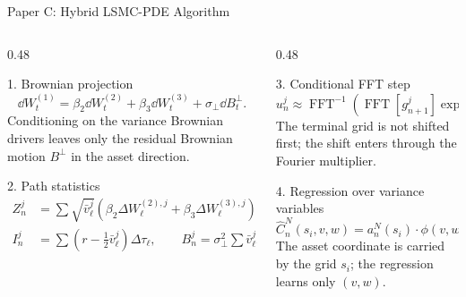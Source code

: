 \begin{frame}{Paper C: Hybrid LSMC-PDE Algorithm}
  \begin{columns}[T,onlytextwidth]
    \begin{column}{0.48\textwidth}
      \begin{block}{1. Brownian projection}
        {\scriptsize
        \[
          \dd W_t^{(1)}=\beta_2\dd W_t^{(2)}+\beta_3\dd W_t^{(3)}+\sigma_\perp\dd B_t^\perp .
        \]}
        Conditioning on the variance Brownian drivers leaves only the residual Brownian motion \(B^\perp\) in the asset direction.
      \end{block}
      \begin{block}{2. Path statistics}
        {\scriptsize
        \[
        \begin{aligned}
        Z_n^j&=\sum \sqrt{\bar v_\ell^j}(\beta_2\Delta W_\ell^{(2),j}+\beta_3\Delta W_\ell^{(3),j}),\\
        I_n^j&=\sum (r-\tfrac12\bar v_\ell^j)\Delta\tau_\ell,\qquad
        B_n^j=\sigma_\perp^2\sum \bar v_\ell^j\Delta\tau_\ell .
        \end{aligned}
        \]}
      \end{block}
    \end{column}
    \begin{column}{0.48\textwidth}
      \begin{block}{3. Conditional FFT step}
        {\scriptsize
        \[
        u_n^j\approx\operatorname{FFT}^{-1}\!\left(
        \operatorname{FFT}[g_{n+1}^j]
        \exp\{i\omega Z_n^j+i\omega I_n^j-\tfrac12\omega^2B_n^j\}
        \right).
        \]}
        The terminal grid is not shifted first; the shift enters through the Fourier multiplier.
      \end{block}
      \begin{block}{4. Regression over variance variables}
        {\scriptsize
        \[
        \widehat C_n^N(s_i,v,w)=a_n^N(s_i)\cdot\phi(v,w),\qquad w=v'.
        \]}
        The asset coordinate is carried by the grid \(s_i\); the regression learns only \((v,w)\).
      \end{block}
    \end{column}
  \end{columns}
\end{frame}

